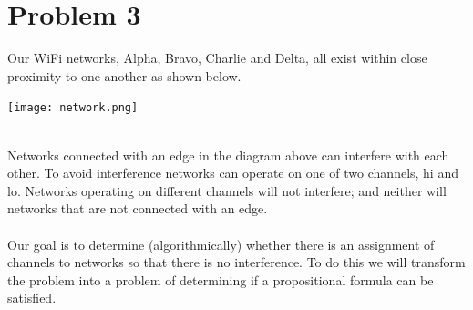 \documentclass{article}
\newcommand*\fixindent{ \hspace{1pt}\\}
\begin{document}
\section{Problem 3}
\begin{flushleft}
Our WiFi networks, Alpha, Bravo, Charlie and Delta, all exist within close proximity to one another as shown below.\\
\end{flushleft}
\begin{centering}\texttt{[image: network.png]}
\end{centering}
\fixindent{}
Networks connected with an edge in the diagram above can interfere with each other. To avoid interference networks can operate on one of two channels, hi and lo. Networks operating on different channels will not interfere; and neither will networks that are not connected with an edge.\\\\
Our goal is to determine (algorithmically) whether there is an assignment of channels to networks so that there is no interference. To do this we will transform the problem into a problem of determining if a propositional formula can be satisfied.\\
\end{document}
